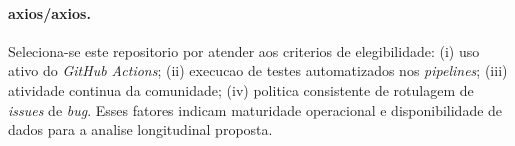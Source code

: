\paragraph{axios/axios.} Seleciona-se este repositorio por atender aos criterios de elegibilidade: (i) uso ativo do \textit{GitHub Actions}; (ii) execucao de testes automatizados nos \textit{pipelines}; (iii) atividade continua da comunidade; (iv) politica consistente de rotulagem de \textit{issues} de \textit{bug}. Esses fatores indicam maturidade operacional e disponibilidade de dados para a analise longitudinal proposta.

